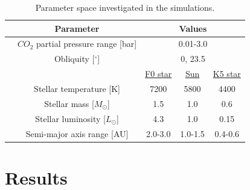 \documentclass[fleqn,usenatbib]{mnras}
\begin{document}

\begin{table}
	\centering
	\caption{Parameter space investigated in the simulations.}
	\label{tab:parameters}
	\begin{tabular}{ccccc}
		\hline
		&\multicolumn{1}{c}{Parameter}&\multicolumn{3}{c}{Values}\\
		\hline
		&\multicolumn{1}{c}{$CO_{\mathrm{2}}$ partial pressure range [bar]}&\multicolumn{3}{c}{0.01-3.0}\\
		&\multicolumn{1}{c}{Obliquity [$^{\circ}$] }&\multicolumn{3}{c}{0, 23.5}\\
		&\multicolumn{1}{c}{}&\multicolumn{1}{c}{\underline{F0 star}}&\multicolumn{1}{c}{\underline{Sun}}&\multicolumn{1}{c}{\underline{K5 star}}\\
		& %
\multicolumn{1}{c}{Stellar temperature [K]} &\multicolumn{1}{c}{7200}&\multicolumn{1}{c}{5800}&\multicolumn{1}{c}{4400}\\
		&\multicolumn{1}{c}{Stellar mass [$M_{\odot}$]}&\multicolumn{1}{c}{1.5}&\multicolumn{1}{c}{1.0}&\multicolumn{1}{c}{0.6}\\
		&\multicolumn{1}{c}{Stellar luminosity [$L_{\odot}$]}&\multicolumn{1}{c}{4.3}&\multicolumn{1}{c}{1.0}&\multicolumn{1}{c}{0.15}\\
		&\multicolumn{1}{c}{Semi-major axis range [AU]}&\multicolumn{1}{c}{2.0-3.0}&\multicolumn{1}{c}{1.0-1.5}&\multicolumn{1}{c}{0.4-0.6}\\
		\hline
	\end{tabular}
\end{table}

\section{Results}
\end{document}
